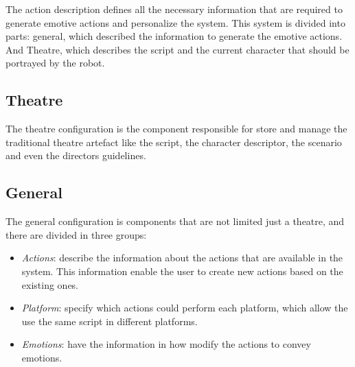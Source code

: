 The action description defines all the necessary information that are required to generate emotive actions and personalize the system. This system is divided into parts: general, which described the information to generate the emotive actions. And Theatre, which describes the script and the current character that should be portrayed by 
the robot.
\subsection{Theatre}
The theatre configuration is the component responsible for store and manage the traditional theatre artefact like the script, the character descriptor, the scenario and even the directors guidelines.
\subsection{General}
The general configuration is components that are not limited just a theatre, and there are divided in three groups:
\begin{itemize}
	\item \textit{Actions}: describe the information about the actions that are available in the system. This information enable the user to create new actions based on the existing ones. 
	\item \textit{Platform}: specify which actions could perform each platform, which allow the use the same script in different platforms.
	\item \textit{Emotions}: have the information in how modify the actions to convey emotions. 
\end{itemize} 
